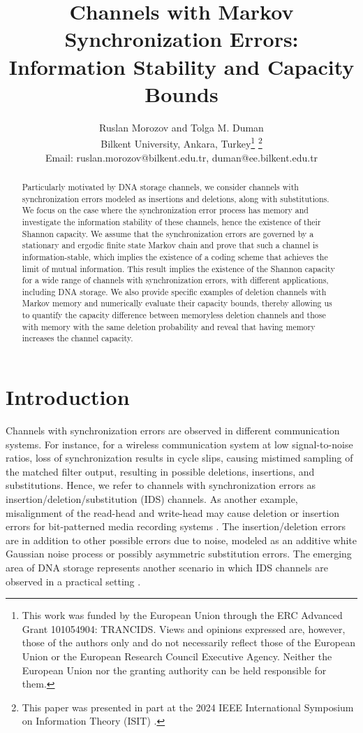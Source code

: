 \documentclass[journal, twocol]{IEEEtran}
\title{Channels with Markov Synchronization Errors: Information Stability and Capacity Bounds}
\author{Ruslan Morozov and Tolga M. Duman\\Bilkent University, Ankara, Turkey\thanks{This work was funded by the European Union through the ERC Advanced Grant 101054904: TRANCIDS. Views and opinions expressed are, however, those of the authors only and do not necessarily reflect those of the European Union or the European Research Council Executive Agency. Neither the European Union nor the granting authority can be held responsible for them.}
\thanks{This paper was presented in part at the 2024 IEEE International Symposium on Information Theory (ISIT) \cite{Morozov2024ISIT}.}\\Email: ruslan.morozov@bilkent.edu.tr, duman@ee.bilkent.edu.tr}
\date{}
\begin{document}
\maketitle 
\begin{abstract}
Particularly motivated by DNA storage channels, we consider channels with synchronization errors modeled as insertions and deletions, along with substitutions. We focus on the case where the synchronization error process has memory and investigate the information stability of these channels, hence the existence of their Shannon capacity. We assume that the synchronization errors are governed by a stationary and ergodic finite state Markov chain and prove that such a channel is information-stable, which implies the existence of a coding scheme that achieves the limit of mutual information. This result implies the existence of the Shannon capacity for a wide range of channels with synchronization errors, with different applications, including DNA storage. We also provide specific examples of deletion channels with Markov memory and numerically evaluate their capacity bounds, thereby allowing us to quantify the capacity difference between memoryless deletion channels and those with memory with the same deletion probability and reveal that having memory increases the channel capacity.
\end{abstract}

\section{Introduction}
\label{s:intr}

Channels with synchronization errors are observed in different communication systems. For instance, for a wireless communication system at low signal-to-noise ratios, loss of synchronization results in cycle slips, causing mistimed sampling of the matched filter output, resulting in possible deletions, insertions, and substitutions. Hence, we refer to channels with synchronization errors as insertion/deletion/substitution (IDS) channels. As another example, misalignment of the read-head and write-head may cause deletion or insertion errors for bit-patterned media recording systems \cite{hu07bit}. The insertion/deletion errors are in addition to other possible errors due to noise, modeled as an additive white Gaussian noise process or possibly asymmetric substitution errors. The emerging area of DNA storage represents another scenario in which IDS channels are observed in a practical setting \cite{shomorony21dna}.
\end{document}
